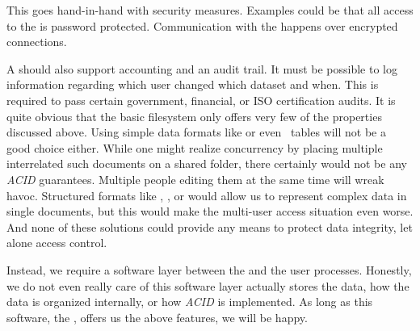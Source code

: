 This goes hand-in-hand with security measures.
Examples could be that all access to the  is password protected.
Communication with the  happens over encrypted connections.

A  should also support accounting and an audit trail.
It must be possible to log information regarding which user changed which dataset and when.
This is required to pass certain government, financial, or ISO certification audits.
\endhsection%
%
%
It is quite obvious that the basic filesystem only offers very few of the properties discussed above.
Using simple data formats like  or even \microsoftExcel\ tables will not be a good choice either.
While one might realize concurrency by placing multiple interrelated such documents on a shared folder, there certainly would not be any \emph{ACID} guarantees.
Multiple people editing them at the same time will wreak havoc.
Structured formats like , , or  would allow us to represent complex data in single documents, but this would make the multi-user access situation even worse.
And none of these solutions could provide any means to protect data integrity, let alone access control.

Instead, we require a software layer between the  and the user processes.
Honestly, we do not even really care of this software layer actually stores the data, how the data is organized internally, or how \emph{ACID} is implemented.
As long as this software, the , offers us the above features, we will be happy.%
\endhsection%
\endhsection%
%
